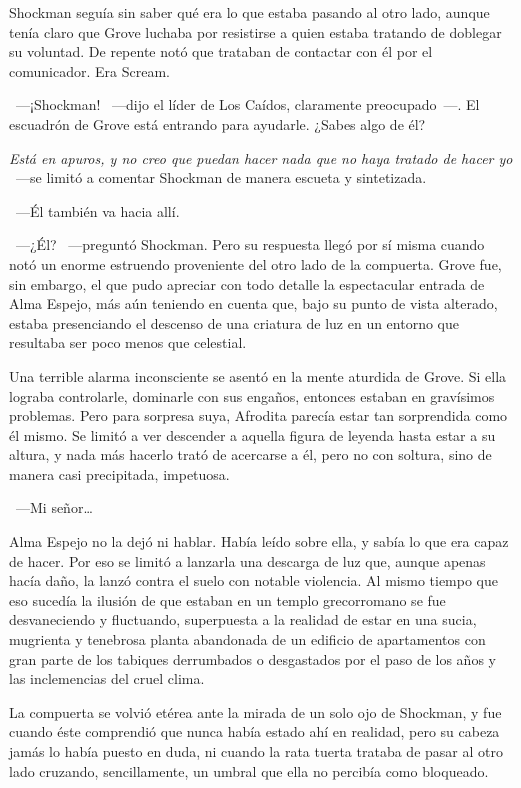 Shockman seguía sin saber qué era lo que estaba pasando al otro lado, aunque tenía claro que Grove luchaba por resistirse a quien estaba tratando de doblegar su voluntad. De repente notó que trataban de contactar con él por el comunicador. Era Scream.

~---¡Shockman! ~---dijo el líder de Los Caídos, claramente preocupado~---. El escuadrón de Grove está entrando para ayudarle. ¿Sabes algo de él?

\emph{Está en apuros, y no creo que puedan hacer nada que no haya tratado de hacer yo} ~---se limitó a comentar Shockman de manera escueta y sintetizada.

~---Él también va hacia allí.

~---¿Él? ~---preguntó Shockman. Pero su respuesta llegó por sí misma cuando notó un enorme estruendo proveniente del otro lado de la compuerta. Grove fue, sin embargo, el que pudo apreciar con todo detalle la espectacular entrada de Alma Espejo, más aún teniendo en cuenta que, bajo su punto de vista alterado, estaba presenciando el descenso de una criatura de luz en un entorno que resultaba ser poco menos que celestial.

Una terrible alarma inconsciente se asentó en la mente aturdida de Grove. Si ella lograba controlarle, dominarle con sus engaños, entonces estaban en gravísimos problemas. Pero para sorpresa suya, Afrodita parecía estar tan sorprendida como él mismo. Se limitó a ver descender a aquella figura de leyenda hasta estar a su altura, y nada más hacerlo trató de acercarse a él, pero no con soltura, sino de manera casi precipitada, impetuosa.

~---Mi señor\dots

Alma Espejo no la dejó ni hablar. Había leído sobre ella, y sabía lo que era capaz de hacer. Por eso se limitó a lanzarla una descarga de luz que, aunque apenas hacía daño, la lanzó contra el suelo con notable violencia. Al mismo tiempo que eso sucedía la ilusión de que estaban en un templo grecorromano se fue desvaneciendo y fluctuando, superpuesta a la realidad de estar en una sucia, mugrienta y tenebrosa planta abandonada de un edificio de apartamentos con gran parte de los tabiques derrumbados o desgastados por el paso de los años y las inclemencias del cruel clima.

La compuerta se volvió etérea ante la mirada de un solo ojo de Shockman, y fue cuando éste comprendió que nunca había estado ahí en realidad, pero su cabeza jamás lo había puesto en duda, ni cuando la rata tuerta trataba de pasar al otro lado cruzando, sencillamente, un umbral que ella no percibía como bloqueado.

